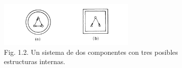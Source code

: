 \newpage
\fancyhf{}
\fancyhead[R]{\thepage} 

\begin{figure}[h!]
    \centering
    \includegraphics[width=0.6\textwidth]{imagenes/figura1.1.png}
    \caption*{Fig. 1.2. Un sistema de dos componentes con tres posibles estructuras internas.}
\end{figure}

\vspace{0.5cm} %


